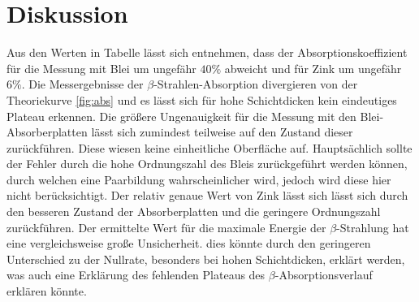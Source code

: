 \section{Diskussion}
\label{sec:Diskussion}
Aus den Werten in Tabelle lässt sich entnehmen, dass der Absorptionskoeffizient für die Messung mit Blei um ungefähr $40\%$ abweicht und für Zink um ungefähr $6\%$.
Die Messergebnisse der $\beta$-Strahlen-Absorption divergieren von der Theoriekurve \ref{fig:abs} und es lässt sich für hohe Schichtdicken kein eindeutiges Plateau erkennen.
Die größere Ungenauigkeit für die Messung mit den Blei-Absorberplatten lässt sich zumindest teilweise auf den Zustand dieser zurückführen.
Diese wiesen keine einheitliche Oberfläche auf.
Hauptsächlich sollte der Fehler durch die hohe Ordnungszahl des Bleis zurückgeführt werden können, 
durch welchen eine Paarbildung wahrscheinlicher wird, jedoch wird diese hier nicht berücksichtigt.
Der relativ genaue Wert von Zink lässt sich lässt sich durch den besseren Zustand der Absorberplatten und die geringere Ordnungszahl zurückführen.
Der ermittelte Wert für die maximale Energie der $\beta$-Strahlung hat eine vergleichsweise große Unsicherheit.
dies könnte durch den geringeren Unterschied zu der Nullrate, besonders bei hohen Schichtdicken, erklärt werden, was auch eine Erklärung des fehlenden Plateaus des $\beta$-Absorptionsverlauf erklären könnte.
